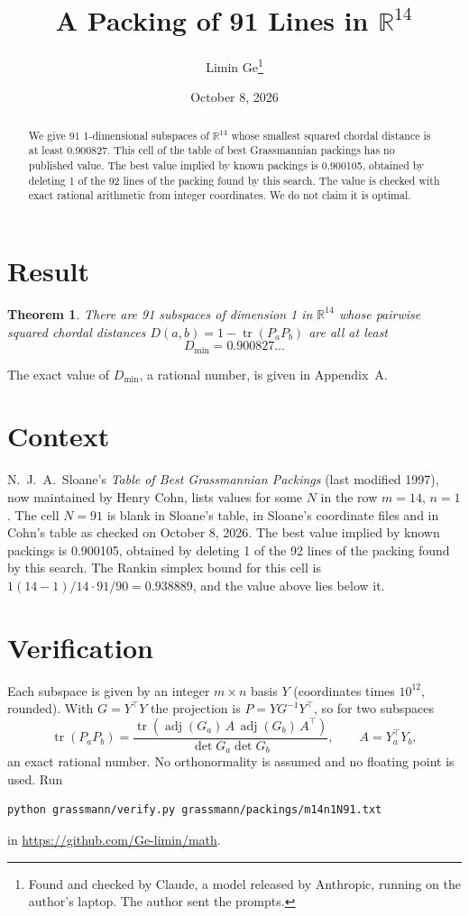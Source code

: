 \documentclass[11pt,a4paper]{article}
\title{A Packing of 91 Lines in $\mathbb{R}^{14}$}
\author{Limin Ge\thanks{Found and checked by Claude, a model released by Anthropic, running on the author's laptop. The author sent the prompts.}}
\date{October 8, 2026}
\newtheorem*{theorem}{Theorem}
\begin{document}
\maketitle
\begin{abstract}
We give 91 1-dimensional subspaces of $\mathbb{R}^{14}$ whose smallest squared chordal distance is at least 0.900827. This cell of the table of best Grassmannian packings has no published value. The best value implied by known packings is 0.900105, obtained by deleting 1 of the 92 lines of the packing found by this search. The value is checked with exact rational arithmetic from integer coordinates. We do not claim it is optimal.
\end{abstract}

\section{Result}
\begin{theorem}
There are 91 subspaces of dimension 1 in $\mathbb{R}^{14}$ whose pairwise squared chordal distances $D(a,b) = 1 - \operatorname{tr}(P_aP_b)$ are all at least
\[ D_{\min} = 0.900827\ldots \]
\end{theorem}
The exact value of $D_{\min}$, a rational number, is given in Appendix~A.


\section{Context}
N.~J.~A.~Sloane's \emph{Table of Best Grassmannian Packings} (last modified 1997), now maintained by Henry Cohn, lists values for some $N$ in the row $m=14$, $n=1$. The cell $N=91$ is blank in Sloane's table, in Sloane's coordinate files and in Cohn's table as checked on October 8, 2026. The best value implied by known packings is 0.900105, obtained by deleting 1 of the 92 lines of the packing found by this search. The Rankin simplex bound for this cell is $1(14-1)/14\cdot 91/90 = 0.938889$, and the value above lies below it.


\section{Verification}
Each subspace is given by an integer $m\times n$ basis $Y$ (coordinates times $10^{12}$, rounded). With $G=Y^\top Y$ the projection is $P=YG^{-1}Y^\top$, so for two subspaces
\[ \operatorname{tr}(P_aP_b)=\frac{\operatorname{tr}(\operatorname{adj}(G_a)\,A\,\operatorname{adj}(G_b)\,A^\top)}{\det G_a\det G_b},\qquad A=Y_a^\top Y_b, \]
an exact rational number. No orthonormality is assumed and no floating point is used. Run
\begin{verbatim}
python grassmann/verify.py grassmann/packings/m14n1N91.txt
\end{verbatim}
in \url{https://github.com/Ge-limin/math}.
\end{document}
